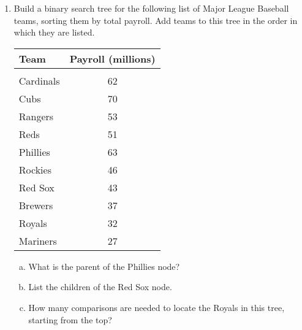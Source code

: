 \begin{enumerate}
\item Build a binary search tree for the following list of Major League Baseball teams, sorting them by total payroll.  Add teams to this tree in the order in which they are listed.
\begin{center}
\begin{tabular}{l c}
\textbf{Team} & \textbf{Payroll (millions)}\\
\hline
& \\
Cardinals & 62\\
Cubs & 70\\
Rangers & 53\\
Reds & 51\\
Phillies & 63\\
Rockies & 46\\
Red Sox & 43\\
Brewers & 37\\
Royals & 32\\
Mariners & 27
\end{tabular}
\end{center}
\begin{enumerate}[(a)]
\item What is the parent of the Phillies node?
\item List the children of the Red Sox node.
\item How many comparisons are needed to locate the Royals in this tree, starting from the top?
\end{enumerate}
\end{enumerate}

